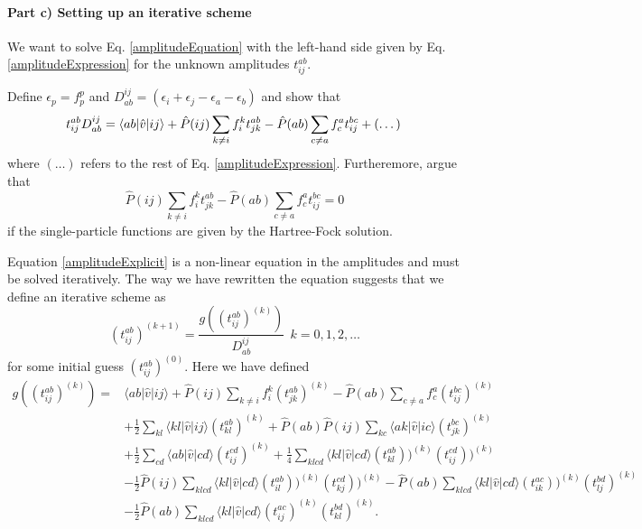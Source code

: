 \documentclass[a4paper,10pt]{article}
\newcommand{\braket}[1]{\langle#1\rangle}
\theoremstyle{definition}
\begin{document}
\paragraph{Part c) Setting up an iterative scheme}
We want to solve Eq. \ref{amplitudeEquation} with the left-hand side given by Eq. \ref{amplitudeExpression} 
for the unknown amplitudes $t^{ab}_{ij}$. 

Define $\epsilon_p = f^p_p$ and $D^{ij}_{ab} = \left( \epsilon_i+\epsilon_j-\epsilon_a-\epsilon_b \right) $ 
and show that 
\begin{equation}
 t^{ab}_{ij}D^{ij}_{ab} = \braket{ab|\hat{v}|ij} + \hat{P} (ij) \sum_ {k\neq i}  f^{k}_{i} t^{ab}_{jk}  - \hat{P} (ab) \sum_ {c\neq a} f^{a}_{c} t^{bc}_{ij} + \left( \dots \right) \label{amplitudeExplicit}\\
\end{equation}
where $\left( \dots \right)$ refers to the rest of Eq. \ref{amplitudeExpression}. Furtheremore, argue that 
\begin{equation}
 \hat{P} (ij) \sum_ {k\neq i}  f^{k}_{i} t^{ab}_{jk}  - \hat{P} (ab) \sum_ {c\neq a} f^{a}_{c} t^{bc}_{ij} = 0
\end{equation}
if the single-particle functions are given by the Hartree-Fock solution.

Equation \ref{amplitudeExplicit} is a non-linear equation in the amplitudes and must be solved iteratively. 
The way we have rewritten the equation suggests that we define an iterative scheme as 
\begin{equation}
 (t^{ab}_{ij})^{(k+1)}  = \frac{g\left((t^{ab}_{ij})^{(k)}\right)}{D^{ij}_{ab}} \ \ k = 0,1,2,\dots \label{IterativeScheme}
\end{equation}
for some initial guess $(t^{ab}_{ij})^{(0)}$. Here we have defined
\begin{align}
 g\left((t^{ab}_{ij})^{(k)}\right) = &\braket{ab|\hat{v}|ij} + \hat{P} (ij) \sum_ {k\neq i}  f^{k}_{i} (t^{ab}_{jk})^{(k)}  - \hat{P} (ab) \sum_ {c\neq a} f^{a}_{c} (t^{bc}_{ij})^{(k)} \nonumber \\
 &+\frac{1}{2} \sum_{kl} \braket{kl|\hat{v}|ij} (t^{ab}_{kl})^{(k)} + \hat{P}(ab) \hat{P}(ij) \sum_{kc} \braket{ak|\hat{v}|ic} (t^{bc}_{jk})^{(k)}  \nonumber \\
 &+ \frac{1}{2} \sum_{cd} \braket{ab|\hat{v}|cd} (t^{cd}_{ij})^{(k)} + \frac{1}{4} \sum_{klcd} \braket{kl|\hat{v}|cd} (t^{ab}_{kl}))^{(k)} (t^{cd}_{ij}))^{(k)} \nonumber \\
 &-  \frac{1}{2}\hat{P} (ij) \sum_{klcd} \braket{kl|\hat{v}|cd} (t^{ab}_{il}))^{(k)} (t^{cd}_{kj}))^{(k)} - \hat{P} (ab) \sum_{klcd} \braket{kl|\hat{v}|cd} (t^{ac}_{ik}))^{(k)} (t^{bd}_{lj})^{(k)} \nonumber \\
 &- \frac{1}{2} \hat{P}(ab) \sum_{klcd} \braket{kl|\hat{v}|cd} (t^{ac}_{ij})^{(k)} (t^{bd}_{kl})^{(k)} \label{gFunction}.
\end{align}
\end{document}
